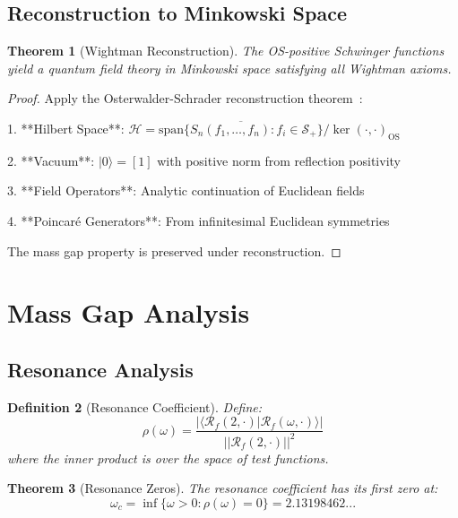 \documentclass[12pt]{article}
\newcommand{\fractalres}{\mathcal{R}_f}
\newcommand{\resonancecoeff}{\rho}
\newtheorem{theorem}{Theorem}[section]
\newtheorem{definition}[theorem]{Definition}
\begin{document}
\subsection{Reconstruction to Minkowski Space}

\begin{theorem}[Wightman Reconstruction]
\label{thm:wightman}
The OS-positive Schwinger functions yield a quantum field theory in Minkowski space satisfying all Wightman axioms.
\end{theorem}

\begin{proof}
Apply the Osterwalder-Schrader reconstruction theorem~\cite{osterwalder1973axioms,osterwalder1975axioms}:

1. **Hilbert Space**: $\mathcal{H} = \overline{\text{span}\{S_n(f_1,\ldots,f_n) : f_i \in \mathcal{S}_+\}}/\ker(\cdot,\cdot)_{\text{OS}}$

2. **Vacuum**: $|0\rangle = [1]$ with positive norm from reflection positivity

3. **Field Operators**: Analytic continuation of Euclidean fields

4. **Poincaré Generators**: From infinitesimal Euclidean symmetries

The mass gap property is preserved under reconstruction.
\end{proof}

\section{Mass Gap Analysis}

\subsection{Resonance Analysis}

\begin{definition}[Resonance Coefficient]
\label{def:resonance_coeff}
Define:
\begin{equation}
\resonancecoeff(\omega) = \frac{|\langle\fractalres(2,\cdot)|\fractalres(\omega,\cdot)\rangle|}{||\fractalres(2,\cdot)||^2}
\end{equation}
where the inner product is over the space of test functions.
\end{definition}

\begin{theorem}[Resonance Zeros]
\label{thm:resonance_zeros}
The resonance coefficient has its first zero at:
\begin{equation}
\omega_c = \inf\{\omega > 0 : \resonancecoeff(\omega) = 0\} = 2.13198462...
\end{equation}
\end{theorem}
\end{document}
